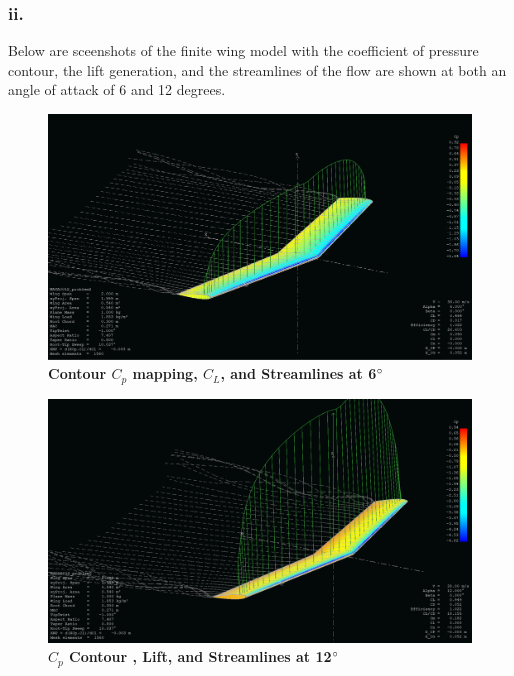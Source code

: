 \begin{singlespace}
\subsubsection{ii.}
Below are sceenshots of the finite wing model with the coefficient of pressure contour, the lift generation, and the streamlines of the flow are shown at both an angle of attack of 6 and 12 degrees.
\begin{figure}[H]
        \centering
        \includegraphics[width=1\textwidth]{homeworks/homework3/george/plots/problem2_b_6.PNG}
        \caption{\textbf{Contour $C_p$ mapping, $C_L$, and Streamlines at 6$\degree$}}
        \label{fig:2bii6}
\end{figure}
\begin{figure}[H]
        \centering
        \includegraphics[width=1\textwidth]{homeworks/homework3/george/plots/problem2_b_12.PNG}
        \caption{\textbf{$C_p$ Contour , Lift, and Streamlines at 12$\degree$}}
        \label{fig:2bii12}
\end{figure}

\end{singlespace}
